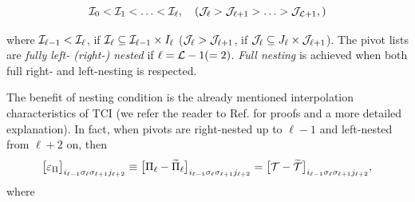 \begin{equation}
	\label{eq:Nesting}
	\mathcal{I}_0 <  \mathcal{I}_1  < \ldots < \mathcal{I}_{\ell} ,\quad (\mathcal{J}_{\ell} > \mathcal{J}_{\ell+1} > \ldots > \mathcal{J}_{\mathcal{L}+1} ,)
\end{equation}

where $\mathcal{I}_{\ell -1 } <\mathcal{I}_\ell$,  if
$\mathcal{I}_\ell \subseteq \mathcal{I}_{\ell -1 } \times 
I_\ell $ ($\mathcal{J}_{\ell} > \mathcal{J}_{\ell +1}$,  if
$\mathcal{J}_\ell \subseteq J_\ell \times \mathcal{J}_{\ell + 1 }$). The pivot lists are \textit{fully left- (right-) nested} if $\ell = \mathcal{L} - 1 (=2)$. \textit{Full nesting} is achieved when both full right- and left-nesting is respected.

The benefit of nesting condition is the already mentioned interpolation characteristics of TCI (we refer the reader to Ref. \cite{Fernandez2022, Fernandez2024} for proofs and a more detailed explanation). In fact, when pivots are right-nested up to $\ell -1$ and left-nested from $\ell +2$ on, then
\begin{equation}
	\label{eq:ErrorPiIsErrorT}
	\bigl[\varepsilon_\Pi\bigr]_{i_{\ell-1}\sigma_\ell \sigma_{\ell +1} j_{\ell +2 }} \equiv \bigl[ \Pi_\ell - \widetilde{\Pi}_\ell\bigr]_{i_{\ell-1}\sigma_\ell \sigma_{\ell +1} j_{\ell +2 }} 
	= 
   \bigl[ \mathcal{T}-\widetilde{\mathcal{T}}\bigr]_{i_{\ell-1}\sigma_\ell \sigma_{\ell +1} j_{\ell+2}},
 \end{equation}
where 

